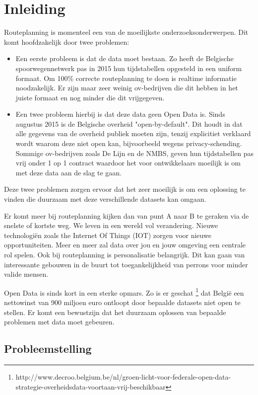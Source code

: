
\chapter{Inleiding}

Routeplanning is momenteel een van de moeilijkste onderzoeksonderwerpen. Dit komt hoofdzakelijk door twee problemen:

\begin{itemize}
\item Een eerste probleem is dat de data moet bestaan. Zo heeft de Belgische spoorwegennetwerk pas in 2015 hun tijdstabellen opgesteld in een uniform formaat.  Om 100\% correcte routeplanning te doen is realtime informatie noodzakelijk. Er zijn maar zeer weinig ov-bedrijven die dit hebben in het juiste formaat en nog minder die dit vrijgegeven.
\item Een twee probleem hierbij is dat deze data geen Open Data is. Sinds augustus 2015 is de Belgische overheid "open-by-default". Dit houdt in dat alle gegevens van de overheid publiek moeten zijn, tenzij explicitiet verklaard wordt waarom deze niet open kan, bijvoorbeeld wegens privacy-schending. Sommige ov-bedrijven zoals De Lijn en de NMBS, geven hun tijdstabellen pas vrij onder 1 op 1 contract waardoor het voor ontwikkelaars moeilijk is om met deze data aan de slag te gaan.\end{itemize}

Deze twee problemen zorgen ervoor dat het zeer moeilijk is om een oplossing te vinden die duurzaam met deze verschillende datasets kan omgaan.

Er komt meer bij routeplanning kijken dan van punt A naar B te geraken via de snelste of kortste weg. We leven in een wereld vol verandering. Nieuwe technologi\"en zoals the Internet Of Things (IOT) zorgen voor nieuwe opportuniteiten. Meer en meer zal data over jou en jouw omgeving een centrale rol spelen. Ook bij routeplanning is personalisatie belangrijk. Dit kan gaan van interessante gebouwen in de buurt tot toegankelijkheid van perrons voor minder valide mensen.

Open Data is sinds kort in een sterke opmars. Zo is er geschat \footnote{http://www.decroo.belgium.be/nl/groen-licht-voor-federale-open-data-strategie-overheidsdata-voortaan-vrij-beschikbaar} dat Belgi\"e een nettowinst van 900 miljoen euro ontloopt door bepaalde datasets niet open te stellen. Er komt een bewustzijn dat het duurzaam oplossen van bepaalde problemen met data moet gebeuren. 

\section{Probleemstelling}
\label{probleemstelling}

